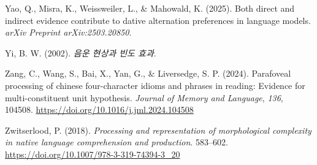 \documentclass[
  12pt,
  letterpaper,
]{scrreprt}
\newlength{\cslhangindent}
\newenvironment{CSLReferences}[2] %
 {\begin{list}{}{%
  \setlength{\itemindent}{0pt}
  \setlength{\leftmargin}{0pt}
  \setlength{\parsep}{0pt}
  \ifodd #1
   \setlength{\leftmargin}{\cslhangindent}
   \setlength{\itemindent}{-1\cslhangindent}
  \fi
  \setlength{\itemsep}{#2\baselineskip}}}
 {\end{list}}
\begin{document}
\begin{CSLReferences}{1}{0}
Yao, Q., Misra, K., Weissweiler, L., \& Mahowald, K. (2025). Both direct
and indirect evidence contribute to dative alternation preferences in
language models. \emph{arXiv Preprint arXiv:2503.20850}.

Yi, B. W. (2002). \emph{음운 현상과 빈도 효과}.

Zang, C., Wang, S., Bai, X., Yan, G., \& Liversedge, S. P. (2024).
Parafoveal processing of chinese four-character idioms and phrases in
reading: Evidence for multi-constituent unit hypothesis. \emph{Journal
of Memory and Language}, \emph{136}, 104508.
\url{https://doi.org/10.1016/j.jml.2024.104508}

Zwitserlood, P. (2018). \emph{Processing and representation of
morphological complexity in native language comprehension and
production}. 583--602.
\url{https://doi.org/10.1007/978-3-319-74394-3_20}

\end{CSLReferences}

\endgroup
\end{document}
